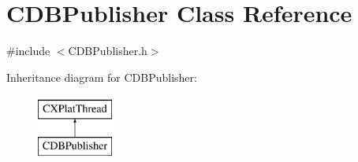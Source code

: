 \hypertarget{class_c_d_b_publisher}{\section{\-C\-D\-B\-Publisher \-Class \-Reference}
\label{class_c_d_b_publisher}
}


{\ttfamily \#include $<$\-C\-D\-B\-Publisher.\-h$>$}

\-Inheritance diagram for \-C\-D\-B\-Publisher\-:\begin{figure}[H]
\begin{center}
\leavevmode
\includegraphics[height=2.000000cm]{class_c_d_b_publisher}
\end{center}
\end{figure}
